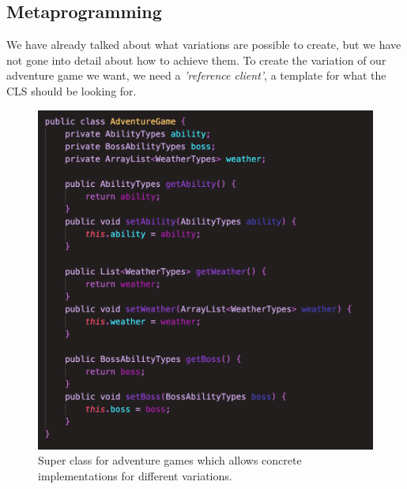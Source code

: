 \subsection{Metaprogramming} \label{Metalanguage}
We have already talked about what variations are possible to create, but we have not gone into detail about how to achieve them. To create the variation of our adventure game we want, we need a \textit{'reference client'}, a template for what the CLS should be looking for.
\begin{figure}
	\vspace{-10px}
	\centering
	\includegraphics[width=\linewidth]{Materials/Adventuregame/AdventureGame}
	\caption{Super class for adventure games which allows concrete implementations for different variations.}
	\label{MetalanguageAdventure}
\end{figure} 

